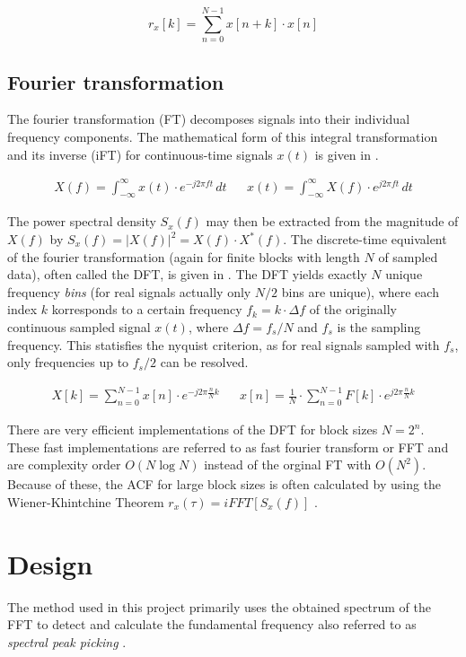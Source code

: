 \documentclass[a4paper, 12pt]{article}
\begin{document}
\begin{equation}
	\label{eq:autocorr-d}
	r_x[k] = \sum_{n=0}^{N-1} x[n + k] \cdot x[n]
\end{equation}

\subsection{Fourier transformation}
The fourier transformation (FT) decomposes signals into their individual frequency components. The mathematical form of this integral transformation and its inverse (iFT) for continuous-time signals $x(t)$ is given in .

\begin{align}
	\label{eq:fourier-c}
	X(f) = \int_{-\infty}^{\infty} x(t) \cdot e^{-j 2\pi ft} \, dt && 
	x(t) = \int_{-\infty}^{\infty} X(f) \cdot e^{j 2\pi ft} \, dt
\end{align}

The power spectral density $S_x(f)$ may then be extracted from the magnitude of $X(f)$ by $S_x(f) = |X(f)|^2 = X(f) \cdot X^*(f)$. The discrete-time equivalent of the fourier transformation (again for finite blocks with length $N$ of sampled data), often called the DFT, is given in . The DFT yields exactly $N$ unique frequency \emph{bins} (for real signals actually only $N/2$ bins are unique), where each index $k$ korresponds to a certain frequency $f_k=k \cdot \Delta f$ of the originally continuous sampled signal $x(t)$, where $\Delta f = f_s/N$ and $f_s$ is the sampling frequency. This statisfies the nyquist criterion, as for real signals sampled with $f_s$, only frequencies up to $f_s/2$ can be resolved.

\begin{align}
	\label{eq:fourier-d}
	X[k] = \sum_{n=0}^{N-1} x[n] \cdot e^{-j 2\pi \frac{n}{N} k} &&
	x[n] = \frac{1}{N} \cdot \sum_{n=0}^{N-1} F[k] \cdot e^{j 2\pi \frac{n}{N} k}
\end{align}

There are very efficient implementations of the DFT for block sizes $N=2^n$. These fast implementations are referred to as fast fourier transform or FFT and are complexity order $O(N \log N)$ instead of the orginal FT with $O(N^2)$. Because of these, the ACF for large block sizes is often calculated by using the Wiener-Khintchine Theorem $r_x(\tau)= iFFT \left[ S_x(f) \right]$ \cite{Apicella2013}.


\section{Design}
The method used in this project primarily uses the obtained spectrum of the FFT to detect and calculate the fundamental frequency also referred to as \emph{spectral peak picking} \cite{Knesebeck2010}.
\end{document}
